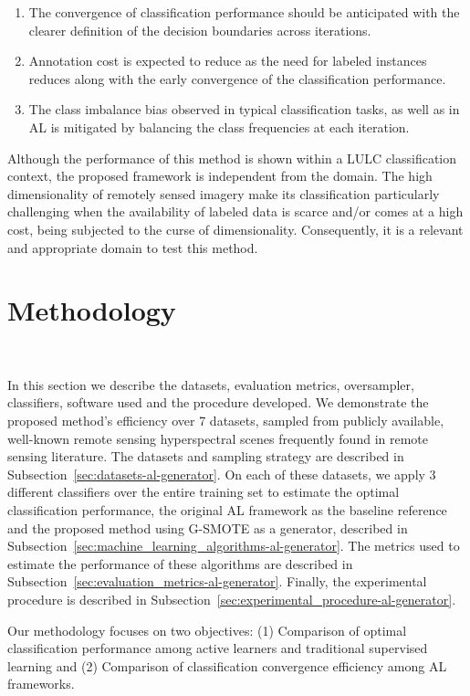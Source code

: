 \begin{enumerate}
    \item The convergence of classification performance should be anticipated
        with the clearer definition of the decision boundaries across
        iterations.
    \item Annotation cost is expected to reduce as the need for labeled
        instances reduces along with the early convergence of the
        classification performance.
    \item The class imbalance bias observed in typical classification tasks, as
        well as in AL is mitigated by balancing the class frequencies at each
        iteration.
\end{enumerate}

Although the performance of this method is shown within a LULC classification
context, the proposed framework is independent from the domain. The high
dimensionality of remotely sensed imagery make its classification particularly
challenging when the availability of labeled data is scarce and/or comes at a
high cost, being subjected to the curse of dimensionality. Consequently, it is
a relevant and appropriate domain to test this method.


\section{Methodology}~\label{sec:methodology-al-generator}

In this section we describe the datasets, evaluation metrics, oversampler,
classifiers, software used and the procedure developed. We demonstrate the
proposed method's efficiency over 7 datasets, sampled from publicly available,
well-known remote sensing hyperspectral scenes frequently found in remote
sensing literature. The datasets and sampling strategy are described in
Subsection~\ref{sec:datasets-al-generator}. On each of these datasets, we apply 3 different
classifiers over the entire training set to estimate the optimal
classification performance, the original AL framework as the baseline
reference and the proposed method using G-SMOTE as a generator, described in
Subsection~\ref{sec:machine_learning_algorithms-al-generator}. The metrics used to estimate
the performance of these algorithms are described in
Subsection~\ref{sec:evaluation_metrics-al-generator}. Finally, the experimental procedure
is described in Subsection~\ref{sec:experimental_procedure-al-generator}. 

Our methodology focuses on two objectives: (1) Comparison of optimal
classification performance among active learners and traditional supervised
learning and (2) Comparison of classification convergence efficiency among AL
frameworks.

